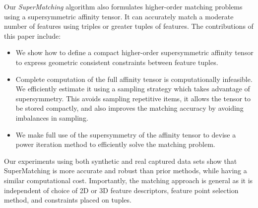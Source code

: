 Our \emph{SuperMatching} algorithm also formulates higher-order matching problems using a supersymmetric affinity tensor. It can accurately match a moderate number
of features using triples or greater tuples of features.
The contributions of this paper include:
\begin{itemize}
\item We show how to define a compact higher-order supersymmetric affinity tensor to express geometric consistent constraints between feature tuples.

\item Complete computation of the full affinity tensor is computationally infeasible. We efficiently estimate it using a sampling strategy which takes advantage of supersymmetry. This avoids sampling repetitive items, it allows the tensor to be stored compactly, and also improves the matching accuracy by avoiding imbalances in sampling.
    
\item We make full use of the supersymmetry of the affinity tensor to devise a power iteration method to efficiently solve the matching problem.
\end{itemize}

Our experiments using both synthetic and real captured data sets show that SuperMatching is more accurate and robust than prior methods,
while having a similar computational cost.
Importantly, the matching approach is general as it is independent of choice of 2D or 3D feature descriptors, feature point selection method, and constraints placed on tuples.
